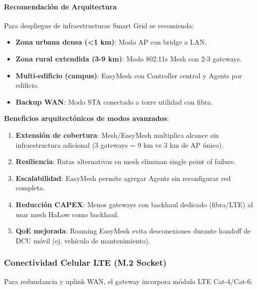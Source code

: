 \paragraph{Recomendación de Arquitectura}

Para despliegue de infraestructuras Smart Grid se recomienda:

\begin{itemize}
    \item \textbf{Zona urbana densa (<1 km)}: Modo AP con bridge a LAN.
    \item \textbf{Zona rural extendida (3-9 km)}: Modo 802.11s Mesh con 2-3 gateways.
    \item \textbf{Multi-edificio (campus)}: EasyMesh con Controller central y Agents por edificio.
    \item \textbf{Backup WAN}: Modo STA conectado a torre utilidad con fibra.
\end{itemize}

\textbf{Beneficios arquitectónicos de modos avanzados}:

\begin{enumerate}
    \item \textbf{Extensión de cobertura}: Mesh/EasyMesh multiplica alcance sin infraestructura adicional (3 gateways = 9 km vs 3 km de AP único).
    \item \textbf{Resiliencia}: Rutas alternativas en mesh eliminan single point of failure.
    \item \textbf{Escalabilidad}: EasyMesh permite agregar Agents sin reconfigurar red completa.
    \item \textbf{Reducción CAPEX}: Menos gateways con backhaul dedicado (fibra/LTE) al usar mesh HaLow como backhaul.
    \item \textbf{QoE mejorada}: Roaming EasyMesh evita desconexiones durante handoff de DCU móvil (ej. vehículo de mantenimiento).
\end{enumerate}

\subsubsection{Conectividad Celular LTE (M.2 Socket)}

Para redundancia y uplink WAN, el gateway incorpora módulo LTE Cat-4/Cat-6:

